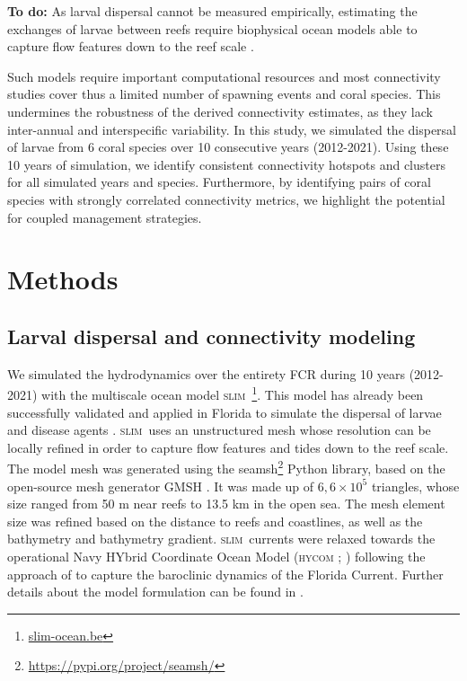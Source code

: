 \documentclass[fleqn,10pt]{wlscirep}
\newcommand{\hycom}{\textsc{hycom} }
\newcommand{\slim}{\textsc{slim}\ }
\begin{document}
\textbf{To do: } As larval dispersal cannot be measured empirically, estimating the exchanges of larvae between reefs require biophysical ocean models able to capture flow features down to the reef scale \citep{saint2023biophysical}. 

Such models require important computational resources and most connectivity studies cover thus a limited number of spawning events and coral species. This undermines the robustness of the derived connectivity estimates, as they lack inter-annual and interspecific variability. In this study, we simulated the dispersal of larvae from 6 coral species over 10 consecutive years (2012-2021). Using these 10 years of simulation, we identify consistent connectivity hotspots and clusters for all simulated years and species. Furthermore, by identifying pairs of coral species with strongly correlated connectivity metrics, we highlight the potential for coupled management strategies. 


\section*{Methods}

\subsection*{Larval dispersal and connectivity modeling}

We simulated the hydrodynamics over the entirety FCR during 10 years (2012-2021) with the multiscale ocean model \slim\footnote{\href{ https://www.slim-ocean.be}{slim-ocean.be}}. This model has already been successfully validated and applied in Florida to simulate the dispersal of larvae and disease agents \citep{frys2020fine,dobbelaere2020coupled}. \slim uses an unstructured mesh whose resolution can be locally refined in order to capture flow features and tides down to the reef scale. The model mesh was generated using the seamsh\footnote{\href{https://pypi.org/project/seamsh/}{https://pypi.org/project/seamsh/}} Python library, based on the open-source mesh generator GMSH \citep{geuzaine2009gmsh}. It was made up of $6,6\times 10^5$ triangles, whose size ranged from 50 m near reefs to 13.5 km in the open sea. The mesh element size was refined based on the distance to reefs and coastlines, as well as the bathymetry and bathymetry gradient. \slim currents were relaxed towards the operational Navy HYbrid Coordinate Ocean Model (\hycom; \citealp{chassignet2007hycom}) following the approach of \citep{dobbelaere2022impacts} to capture the baroclinic dynamics of the Florida Current. Further details about the model formulation can be found in \citep{frys2020fine}.
\end{document}

